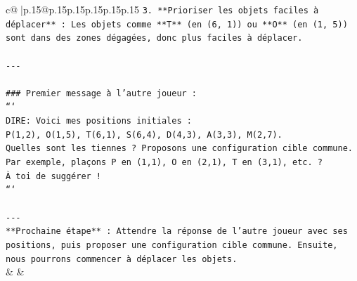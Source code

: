 \documentclass{article}
\begin{document}
{\begin{supertabular}{c@{$\;$}|p{.15\linewidth}@{}p{.15\linewidth}p{.15\linewidth}p{.15\linewidth}p{.15\linewidth}p{.15\linewidth}}
{{{\texttt{3. **Prioriser les objets faciles à déplacer** : Les objets comme **T** (en (6, 1)) ou **O** (en (1, 5)) sont dans des zones dégagées, donc plus faciles à déplacer.} \\
\\ 
\texttt{{-}{-}{-}} \\
\\ 
\texttt{\#\#\# Premier message à l'autre joueur :} \\
\texttt{```} \\
\texttt{DIRE: Voici mes positions initiales :} \\
\texttt{P(1,2), O(1,5), T(6,1), S(6,4), D(4,3), A(3,3), M(2,7).} \\
\texttt{Quelles sont les tiennes ? Proposons une configuration cible commune.} \\
\texttt{Par exemple, plaçons P en (1,1), O en (2,1), T en (3,1), etc. ?} \\
\texttt{À toi de suggérer !} \\
\texttt{```} \\
\\ 
\texttt{{-}{-}{-}} \\
\texttt{**Prochaine étape** : Attendre la réponse de l'autre joueur avec ses positions, puis proposer une configuration cible commune. Ensuite, nous pourrons commencer à déplacer les objets.} \\
            }
        }
    }
    & & \\ \\


\end{supertabular}}
\end{document}
